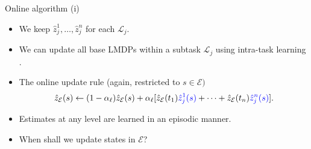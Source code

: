 \documentclass{beamer}
\theoremstyle{mystyle}
\newcommand{\cE}{\mathcal{E}}
\newcommand{\cL}{\mathcal{L}}
\newcommand{\cR}{\mathcal{R}}
\newcommand{\cT}{\mathcal{T}}
\begin{document}
%
%
%
%
%
%
%    

\begin{frame}{Online algorithm (i)}

\begin{itemize}
    
    \item We keep $\hat{z}_j^1,\ldots,\hat{z}_j^n$ for each $\cL_j$.
    \item We can update all base LMDPs within a subtask $\cL_j$ using intra-task learning \citep{Kaelbling93,conf/icaps/Jonsson16}.
    \item The online update rule (again, restricted to $s \in \cE)$
    \[
        \hat{z}_\cE(s) \leftarrow (1 - \alpha_\ell) \hat{z}_\cE(s) + \alpha_\ell [\hat{z}_\cE(t_1) {\color{blue}\hat{z}_j^1(s)} + \cdots + \hat{z}_\cE(t_n) {\color{blue} \hat{z}_j^n(s)}].
    \]
    \item Estimates at any level are learned in an episodic manner.
    \item When shall we update states in $\cE$?
\end{itemize}
    
\end{frame}
\end{document}

